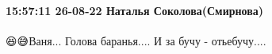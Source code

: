  
 
 
 
 

\paragraph{15:57:11 26-08-22 Наталья Соколова(Смирнова)}

😆😅Ваня... Голова баранья.... И за бучу - отьебучу....
